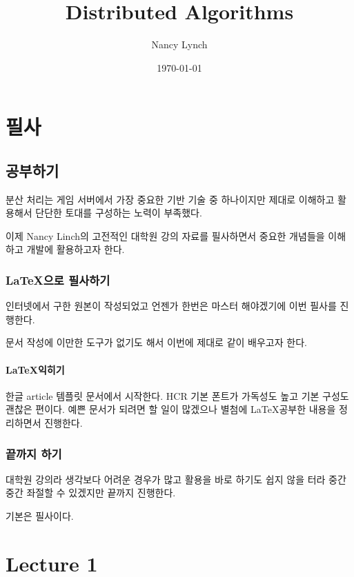\documentclass{report}
\theoremstyle{plain}
\theoremstyle{definition}
\theoremstyle{remark}
\begin{document}
\title{Distributed Algorithms}
\author{Nancy Lynch}
\date{\today}

\maketitle

\newpage
\tableofcontents
\newpage
{}

\chapter{필사}

\section{공부하기}

분산 처리는 게임 서버에서 가장 중요한 기반 기술 중 하나이지만 
제대로 이해하고 활용해서 단단한 토대를 구성하는 노력이 부족했다. 

이제 Nancy Linch의 고전적인 대학원 강의 자료를 필사하면서 
중요한 개념들을 이해하고 개발에 활용하고자 한다.

\subsection{\LaTeX 으로 필사하기}

인터넷에서 구한 원본이  작성되었고 언젠가 한번은 마스터 해야겠기에 
이번 필사를  진행한다. 

문서 작성에 이만한 도구가 없기도 해서 이번에 제대로 같이 배우고자 한다. 

\subsubsection{\LaTeX 익히기}

한글 article 템플릿 문서에서 시작한다. HCR 기본 폰트가 가독성도 높고 
기본 구성도 괜찮은 편이다. 예쁜 문서가 되려면 할 일이 많겠으나 
별첨에 \LaTeX 공부한 내용을 정리하면서 진행한다. 

\subsection{끝까지 하기}

대학원 강의라 생각보다 어려운 경우가 많고 활용을 바로 하기도 쉽지 않을 터라 
중간 중간 좌절할 수 있겠지만 끝까지 진행한다. 

기본은 필사이다. 

\chapter{Lecture 1}
\end{document}
